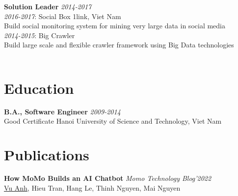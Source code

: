 \documentclass[11pt,a4paper,roman]{article}
\begin{document}
\noindent
\textbf{Solution Leader}
\hfill
\textit{2014-2017} \\
\textit{2016-2017}: Social Box
\hfill
1link, Viet Nam
\\
Build social monitoring system for mining very large data in social media
\\
\textit{2014-2015}: Big Crawler\\
Build large scale and flexible crawler framework using Big Data technologies
\\
\\

\section{Education}

\textbf{B.A., Software Engineer}
\hfill
\textit{2009-2014} \\
Good Certificate
\hfill
Hanoi University of Science and Technology, Viet Nam


\section{Publications}

\textbf{How MoMo Builds an AI Chatbot}
\hfill
\textit{Momo Technology Blog'2022} \\
\underline{Vu Anh}, Hieu Tran, Hang Le, Thinh Nguyen, Mai Nguyen
\\
\end{document}
